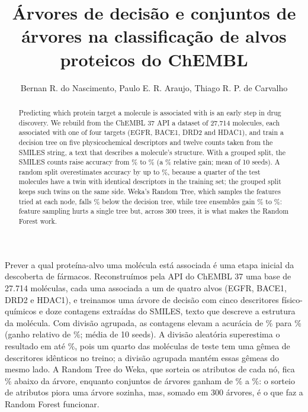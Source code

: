 \documentclass[12pt]{article}
\title{Árvores de decisão e conjuntos de árvores na classificação de alvos proteicos do ChEMBL}
\author{Bernan R. do Nascimento\inst{1}, Paulo E. R. Araujo\inst{1}, Thiago R. P. de Carvalho\inst{1}}
\begin{document}
\maketitle

\begin{abstract}
  Predicting which protein target a molecule is associated with is an early step in drug discovery.
  We rebuild from the ChEMBL 37 API a dataset of 27,714 molecules, each associated with one of four
  targets (EGFR, BACE1, DRD2 and HDAC1), and train a decision tree on five physicochemical
  descriptors and twelve counts taken from the SMILES string, a text that describes a molecule's
  structure. With a grouped split, the SMILES counts raise accuracy from \accGrupDescEn\% to
  \accGrupAmbosEn\% (a \ganhoAmbosEn\% relative gain; mean of 10 seeds). A random split overestimates
  accuracy by up to \gapMaxEn\%, because a quarter of the test molecules have a twin with identical
  descriptors in the training set; the grouped split keeps such twins on the same side. Weka's Random
  Tree, which samples the features tried at each node, falls \relRTEn\% below the decision tree, while
  tree ensembles gain \relHGBEn\% to \relGBajEn\%: feature sampling hurts a single tree but, across
  300 trees, it is what makes the Random Forest work.
\end{abstract}

\begin{resumo}
  Prever a qual proteína-alvo uma molécula está associada é uma etapa inicial da descoberta de
  fármacos. Reconstruímos pela API do ChEMBL 37 uma base de 27.714 moléculas, cada uma associada a
  um de quatro alvos (EGFR, BACE1, DRD2 e HDAC1), e treinamos uma árvore de decisão com cinco
  descritores físico-químicos e doze contagens extraídas do SMILES, texto que descreve a estrutura
  da molécula. Com divisão agrupada, as contagens elevam a acurácia de \accGrupDesc\% para
  \accGrupAmbos\% (ganho relativo de \ganhoAmbos\%; média de 10 seeds). A divisão aleatória
  superestima o resultado em até \gapMax\%, pois um quarto das moléculas de teste tem uma gêmea de
  descritores idênticos no treino; a divisão agrupada mantém essas gêmeas do mesmo lado. A Random Tree
  do Weka, que sorteia os atributos de cada nó, fica \relRT\% abaixo da árvore, enquanto conjuntos de
  árvores ganham de \relHGB\% a \relGBaj\%: o sorteio de atributos piora uma árvore sozinha, mas,
  somado em 300 árvores, é o que faz a Random Forest funcionar.
\end{resumo}












\end{document}
